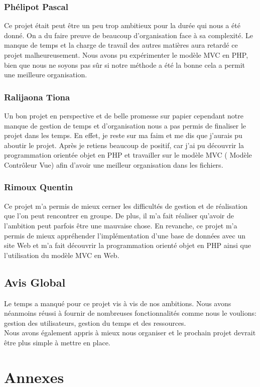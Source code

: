\documentclass[11pt,a4paper]{article}
\begin{document}
\subsubsection{Phélipot Pascal}
Ce projet était peut être un peu trop ambitieux pour la durée qui nous a été donné. On a du faire preuve de beaucoup d'organisation face à sa complexité. Le manque de temps et la charge de travail des autres matières aura retardé ce projet malheureusement. Nous avons pu expérimenter le modèle MVC en PHP, bien que nous ne soyons pas sûr si notre méthode a été la bonne cela a permit une meilleure organisation.
\subsubsection{Ralijaona Tiona}
Un bon projet en perspective et de belle promesse sur papier cependant notre manque de gestion de temps et d'organisation nous a pas permis de finaliser le projet dans les temps. En effet, je reste sur ma faim et me dis que j'aurais pu aboutir le projet. Après je retiens beaucoup de positif, car j'ai pu découvrir la programmation orientée objet en PHP et travailler sur le modèle MVC ( Modèle Contrôleur Vue) afin d'avoir une meilleur organisation dans les fichiers. 
\subsubsection{Rimoux Quentin}
Ce projet m'a permis de mieux cerner les difficultés de gestion et de réalisation que l'on peut rencontrer en groupe. De plus, il m'a fait réaliser qu'avoir de l'ambition peut parfois être une mauvaise chose. En revanche, ce projet m'a permis de mieux appréhender l'implémentation d'une base de données avec un site Web et m'a fait découvrir la programmation orienté objet en PHP ainsi que l'utilisation du modèle MVC en Web.
\subsection{Avis Global}
Le temps a manqué pour ce projet vis à vis de nos ambitions. Nous avons néanmoins réussi à fournir de nombreuses fonctionnalités comme nous le voulions: gestion des utilisateurs, gestion du temps et des ressources.\\
Nous avons également appris à mieux nous organiser et le prochain projet devrait être plus simple à mettre en place.

\newpage{}
\section{Annexes}
\end{document}
